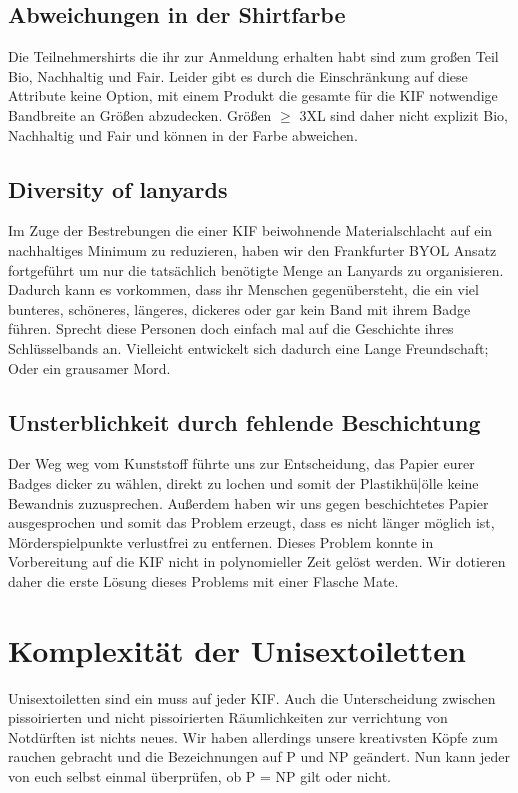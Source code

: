 \subsection*{Abweichungen in der Shirtfarbe}
Die Teilnehmershirts die ihr zur Anmeldung erhalten habt sind zum großen Teil Bio, Nachhaltig und
Fair. Leider gibt es durch die Einschränkung auf diese Attribute keine Option, mit einem Produkt die
gesamte für die KIF notwendige Bandbreite an Größen abzudecken. Größen $\geq$ 3XL sind daher nicht
explizit Bio, Nachhaltig und Fair und können in der Farbe abweichen.

\subsection*{Diversity of lanyards}
Im Zuge der Bestrebungen die einer KIF beiwohnende Materialschlacht auf ein nachhaltiges Minimum zu
reduzieren, haben wir den Frankfurter BYOL Ansatz fortgeführt um nur die tatsächlich benötigte Menge
an Lanyards zu organisieren. Dadurch kann es vorkommen, dass ihr Menschen gegenübersteht, die ein
viel bunteres, schöneres, längeres, dickeres oder gar kein Band mit ihrem Badge führen. Sprecht
diese Personen doch einfach mal auf die Geschichte ihres Schlüsselbands an. Vielleicht entwickelt
sich dadurch eine Lange Freundschaft; Oder ein grausamer Mord.

\subsection*{Unsterblichkeit durch fehlende Beschichtung}
Der Weg weg vom Kunststoff führte uns zur Entscheidung, das Papier eurer Badges dicker zu wählen,
direkt zu lochen und somit der Plastikh{ü|ö}lle keine Bewandnis zuzusprechen. Außerdem haben wir uns
gegen beschichtetes Papier ausgesprochen und somit das Problem erzeugt, dass es nicht länger möglich
ist, Mörderspielpunkte verlustfrei zu entfernen. Dieses Problem konnte in Vorbereitung auf die KIF
nicht in polynomieller Zeit gelöst werden. Wir dotieren daher die erste Lösung dieses Problems mit
einer Flasche Mate.

\section*{Komplexität der Unisextoiletten}
Unisextoiletten sind ein muss auf jeder KIF. Auch die Unterscheidung zwischen pissoirierten und
nicht pissoirierten Räumlichkeiten zur verrichtung von Notdürften ist nichts neues. Wir haben
allerdings unsere kreativsten Köpfe zum rauchen gebracht und die Bezeichnungen auf P und NP
geändert. Nun kann jeder von euch selbst einmal überprüfen, ob P = NP gilt oder nicht.

